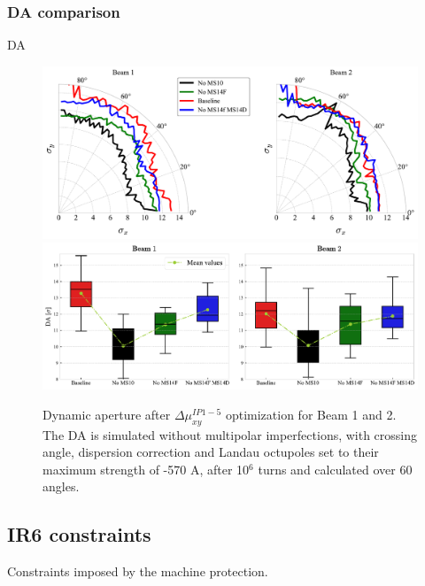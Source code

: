 \documentclass{cernatsnote}
\begin{document}
\subsubsection{DA comparison}

DA

\begin{figure}[h!]
\centering
\includegraphics[width=1\textwidth]{images/da_polar_all_b12.pdf}\\
\hbox{\hspace{0.0cm}\includegraphics[width=1.0\textwidth]{images/da_all_b12.pdf}}
\caption{\label{da_final_all} Dynamic aperture after $\Delta\mu_{xy}^{IP1-5}$ optimization for Beam 1 and 2. The DA is simulated without multipolar imperfections, with crossing angle, dispersion correction and Landau octupoles set to their maximum strength of -570 A, after 10$^{6}$ turns and calculated over 60 angles. }
\end{figure}


\subsection{IR6 constraints}

Constraints imposed by the machine protection.
\end{document}
